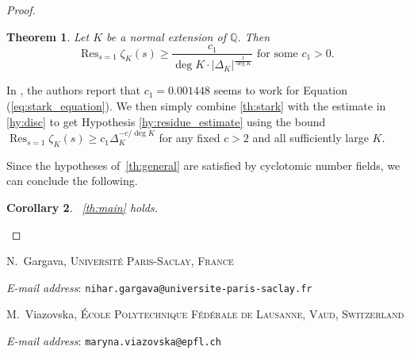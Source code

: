 \documentclass[a4paper]{article}
\newtheorem{theorem}{Theorem}
\newtheorem{corollary}[theorem]{Corollary}
\theoremstyle{definition}
\theoremstyle{remark}
\DeclareMathOperator{\Res}{Res}
\begin{document}
\begin{proof}
\begin{enumerate}
\begin{theorem}
Let $K$ be a normal extension of $\mathbb{Q}$. Then
\begin{equation}
	\label{eq:stark_equation}
  \Res_{s=1} \zeta_K(s) \geq  \frac{c_1}{\deg K\cdot |\Delta_K|^{\frac{1}{\deg K}}} \text{ for some }c_1 > 0.
\end{equation}
\end{theorem}
In \cite{GL22}, the authors report that $c_1 = 0.001448$ seems to work for Equation (\ref{eq:stark_equation}). 
We then simply combine \cref{th:stark} with the estimate in \cref{hy:disc} to get Hypothesis \ref{hy:residue_estimate} 
 using the bound
  $\Res_{s=1}\zeta_K(s)\geq c_1\Delta_K^{-c/\deg K}$
  for any fixed $c>2$ and all sufficiently large $K$.

\end{enumerate}

Since the hypotheses of~\cref{th:general} are satisfied by cyclotomic number fields, we can conclude the following.

\begin{corollary}
   ~\cref{th:main} holds.
\end{corollary}

    
\end{proof}






 

  
\bigskip
  \footnotesize

  N.~Gargava, \textsc{Université Paris-Saclay, France}\par\nopagebreak
  \textit{E-mail address}:  \texttt{nihar.gargava@universite-paris-saclay.fr}

  \medskip

  M.~Viazovska, \textsc{École Polytechnique Fédérale de Lausanne,
    Vaud, Switzerland}\par\nopagebreak
  \textit{E-mail address}:  \texttt{maryna.viazovska@epfl.ch}
\end{document}
